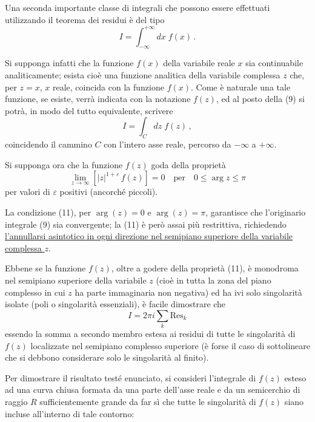 \documentclass[11pt, a4paper]{book}
\numberwithin{equation}{section}
\begin{document}
Una seconda importante classe di integrali che possono essere effettuati utilizzando il teorema dei residui è del tipo
\begin{equation}
I = \int_{-\infty}^{+\infty} dx\; f(x)\,. \tag{9}
\end{equation}

Si supponga infatti che la funzione $f(x)$ della variabile reale $x$ sia continuabile analiticamente; esista cioè una funzione analitica della variabile complessa $z$ che, per $z = x$, $x$ reale, coincida con la funzione $f(x)$. Come è naturale una tale funzione, se esiste, verrà indicata con la notazione%
$f(z)$, ed al posto della (9) si potrà, in modo del tutto equivalente, scrivere
\begin{equation}
I = \int_C dz\; f(z)\,, \tag{10}
\end{equation}
coincidendo il cammino $C$ con l'intero asse reale, percorso da $-\infty$ a $+\infty$.

Si supponga ora che la funzione $f(z)$ goda della proprietà
\begin{equation}
\lim_{z \to \infty} \left[|z|^{1+\varepsilon}\,f(z)\right] = 0 \quad \text{per} \quad 0 \leq \arg z \leq \pi \tag{11}
\end{equation}
per valori di $\varepsilon$ positivi (ancorché piccoli).

La condizione (11), per $\arg(z)=0$ e $\arg(z)=\pi$, garantisce che l'originario integrale (9) sia convergente; la (11) è però assai più restrittiva, richiedendo \underline{l'annullarsi asintotico in ogni direzione nel semipiano superiore della variabile complessa $z$}.

Ebbene se la funzione $f(z)$, oltre a godere della proprietà (11), è monodroma nel semipiano superiore della variabile $z$ (cioè in tutta la zona del piano complesso in cui $z$ ha parte immaginaria non negativa) ed ha ivi solo singolarità isolate (poli o singolarità essenziali), è facile dimostrare che
\begin{equation}
I = 2\pi i \sum_k \mathrm{Res}_k \tag{12}
\end{equation}
essendo la somma a secondo membro estesa ai residui di tutte le singolarità di $f(z)$ localizzate nel semipiano complesso superiore (è forse il caso di sottolineare che si debbono considerare solo le singolarità al finito).

Per dimostrare il risultato testé enunciato, si consideri l'integrale di $f(z)$ esteso ad una curva chiusa formata da una parte dell'asse reale e da un semicerchio di raggio $R$ sufficientemente grande da far sì che tutte le singolarità di $f(z)$ siano incluse all'interno di tale contorno:
\end{document}
